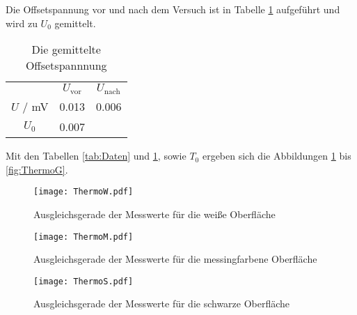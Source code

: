 Die Offsetspannung vor und nach dem Versuch ist in Tabelle \ref{tab:Offset} aufgeführt und wird zu $U_\text{0}$ gemittelt.

\begin{table}
  \centering
  \begin{tabular}{c c c}
    \toprule
      & $U_\text{vor}$ & $U_\text{nach}$  \\
      $U$ / mV      & 0.013 & 0.006       \\
      $U_\text{0}$  & 0.007 &             \\
    \bottomrule
  \end{tabular}
  \caption{Die gemittelte Offsetspannnung}
  \label{tab:Offset}
\end{table}

Mit den Tabellen \ref{tab:Daten} und \ref{tab:Offset}, sowie $T_0$ ergeben sich die Abbildungen \ref{fig:ThermoW} bis \ref{fig:ThermoG}.
\begin{figure}[H]
  \centering
  \texttt{[image: ThermoW.pdf]}
  \caption{Ausgleichsgerade der Messwerte für die weiße Oberfläche}
  \label{fig:ThermoW}
\end{figure}

\begin{figure}[H]
  \centering
  \texttt{[image: ThermoM.pdf]}
  \caption{Ausgleichsgerade der Messwerte für die messingfarbene Oberfläche}
  \label{fig:ThermoM}
\end{figure}

\begin{figure}[H]
  \centering
  \texttt{[image: ThermoS.pdf]}
  \caption{Ausgleichsgerade der Messwerte für die schwarze Oberfläche}
  \label{fig:ThermoS}
\end{figure}

